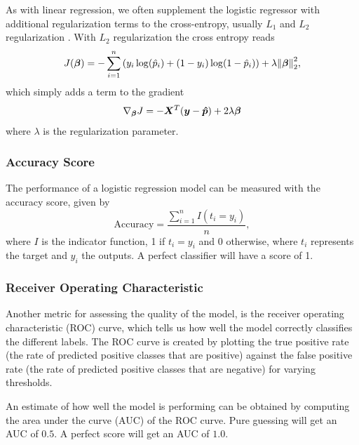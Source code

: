 As with linear regression, we often supplement the logistic regressor with additional regularization terms to the cross-entropy, usually $L_1$ and $L_2$ regularization \cite{logreglec}. With $L_2$ regularization the cross entropy reads
\begin{equation}\label{eq:cross-ent with L2 reg}
    J (\bm{\beta}) = - \sum_{i=1}^n \qty(y_i \log(\hat{p}_i) + (1-y_i) \log(1 - \hat{p}_i) ) + \lambda \norm{\bm{\beta}}_2^2,
\end{equation}
which simply adds a term to the gradient
\begin{equation}\label{eq:logcost deriv L2 reg}
    \nabla_{\bm{\beta}} J = -\bm{X}^T \qty(\bm{y} -\bm{\hat{p}}) + 2\lambda \bm{\beta}
\end{equation}
where $\lambda$ is the regularization parameter. 


\subsubsection{Accuracy Score}

The performance of a logistic regression model can be measured with the accuracy score, given by
\begin{equation}\label{eq:accuracy score}
    \text{Accuracy} = \frac{\sum_{i=1}^n I(t_i = y_i)}{n},
\end{equation}
where $I$ is the indicator function, 1 if $t_i = y_i$ and 0 otherwise, where $t_i$ represents the target and $y_i$ the outputs. A perfect classifier will have a score of 1.

\subsubsection{Receiver Operating Characteristic} 
Another metric for assessing the quality of the model, is the receiver operating characteristic (ROC) curve, which tells us how well the model correctly classifies the different labels. The ROC curve is created by plotting the true positive rate (the rate of predicted positive classes that are positive) against the false positive rate (the rate of predicted positive classes that are negative) for varying thresholds. 

An estimate of how well the model is performing can be obtained by computing the area under the curve (AUC) of the ROC curve. Pure guessing will get an AUC of $0.5$. A perfect score will get an AUC of $1.0$. \cite{logregMorten}


